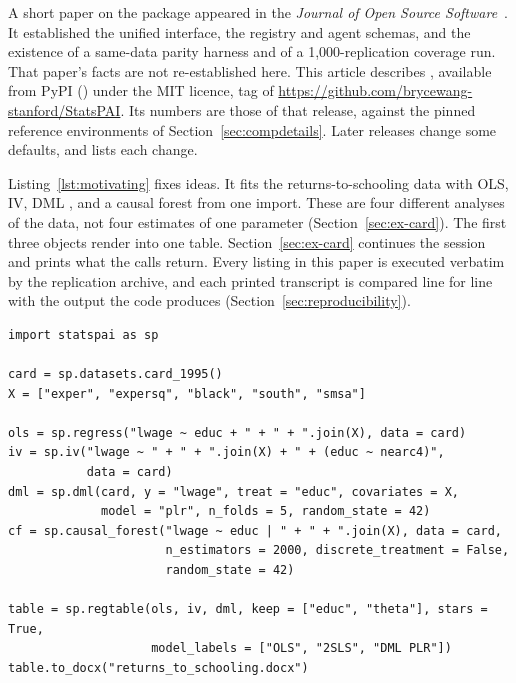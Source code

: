 A short paper on the package appeared in the \emph{Journal of Open
Source Software}~\citep{wang2026statspaijoss}. It established the
unified interface, the registry and agent schemas, and the existence of
a same-data parity harness and of a 1{,}000-replication coverage run.
That paper's facts are not re-established here. This article describes \statspai{} \StatsPAIVersion{}, available from PyPI
() under the MIT licence,
tag  of
\url{https://github.com/brycewang-stanford/StatsPAI}. Its numbers are
those of that release, against the pinned reference environments of
Section~\ref{sec:compdetails}. Later releases change some defaults, and
 lists each change.

Listing~\ref{lst:motivating} fixes ideas. It fits the
\citet{card1995using} returns-to-schooling data with OLS, IV, DML
\citep{chernozhukov2018double}, and a causal forest
\citep{wager2018estimation} from one import. These are four different
analyses of the data, not four estimates of one parameter
(Section~\ref{sec:ex-card}). The first three objects render into one
table. Section~\ref{sec:ex-card} continues the session and prints what
the calls return. Every listing in this paper is executed verbatim by
the replication archive, and each printed transcript is compared line
for line with the output the code produces
(Section~\ref{sec:reproducibility}).

\begin{lstlisting}[caption={Four analyses of the \citet{card1995using}
data from a single import, and one table of the three that report a
coefficient.},label={lst:motivating},captionpos=b]
import statspai as sp

card = sp.datasets.card_1995()
X = ["exper", "expersq", "black", "south", "smsa"]

ols = sp.regress("lwage ~ educ + " + " + ".join(X), data = card)
iv = sp.iv("lwage ~ " + " + ".join(X) + " + (educ ~ nearc4)",
           data = card)
dml = sp.dml(card, y = "lwage", treat = "educ", covariates = X,
             model = "plr", n_folds = 5, random_state = 42)
cf = sp.causal_forest("lwage ~ educ | " + " + ".join(X), data = card,
                      n_estimators = 2000, discrete_treatment = False,
                      random_state = 42)

table = sp.regtable(ols, iv, dml, keep = ["educ", "theta"], stars = True,
                    model_labels = ["OLS", "2SLS", "DML PLR"])
table.to_docx("returns_to_schooling.docx")
\end{lstlisting}

